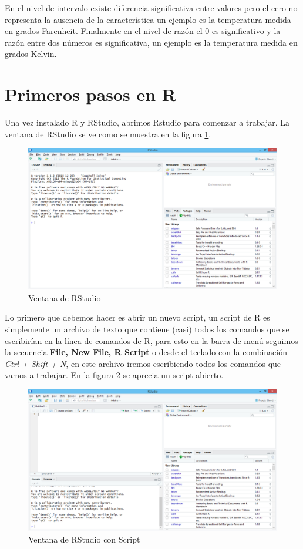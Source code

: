 \documentclass[]{book}
\begin{document}
En el nivel de intervalo existe diferencia significativa entre valores
pero el cero no representa la ausencia de la característica un ejemplo
es la temperatura medida en grados Farenheit. Finalmente en el nivel de
razón el 0 es significativo y la razón entre dos números es
significativa, un ejemplo es la temperatura medida en grados Kelvin.

\section{Primeros pasos en R}\label{primeros-pasos-en-r}

Una vez instalado R y RStudio, abrimos Rstudio para comenzar a trabajar.
La ventana de RStudio se ve como se muestra en la figura
\ref{fig:rstudio1}.

\begin{figure}[h]

{\centering \includegraphics[width=0.5\linewidth]{rstudio1} 

}

\caption{Ventana de RStudio}\label{fig:rstudio1}
\end{figure}

Lo primero que debemos hacer es abrir un nuevo script, un script de R es
simplemente un archivo de texto que contiene (casi) todos los comandos
que se escribirían en la línea de comandos de R, para esto en la barra
de menú seguimos la secuencia \textbf{File, New File, R Script} o desde
el teclado con la combinación \emph{Ctrl + Shift + N}, en este archivo
iremos escribiendo todos los comandos que vamos a trabajar. En la figura
\ref{fig:rstudio2} se aprecia un script abierto.

\begin{figure}[h]

{\centering \includegraphics[width=0.5\linewidth]{rstudio2} 

}

\caption{Ventana de RStudio con Script}\label{fig:rstudio2}
\end{figure}
\end{document}

